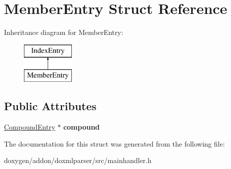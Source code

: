 \hypertarget{struct_member_entry}{}\section{Member\+Entry Struct Reference}
\label{struct_member_entry}
Inheritance diagram for Member\+Entry\+:\begin{figure}[H]
\begin{center}
\leavevmode
\includegraphics[height=2.000000cm]{struct_member_entry}
\end{center}
\end{figure}
\subsection*{Public Attributes}
\begin{DoxyCompactItemize}
\item 
\mbox{\label{struct_member_entry_a2932501c3e6ded8652793323cbf6ae2a}} 
\mbox{\hyperlink{struct_compound_entry}{Compound\+Entry}} $\ast$ {\bfseries compound}
\end{DoxyCompactItemize}


The documentation for this struct was generated from the following file\+:\begin{DoxyCompactItemize}
\item 
doxygen/addon/doxmlparser/src/mainhandler.\+h\end{DoxyCompactItemize}
